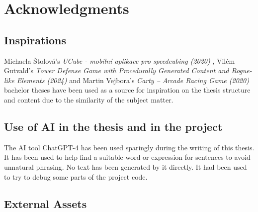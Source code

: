 \chapter{Acknowledgments}

\section{Inspirations}
Michaela Štolová's \textit{UCube - mobilní aplikace pro speedcubing (2020)} \cite{Stolova2020}, Vilém Gutvald's \textit{Tower Defense Game with Procedurally Generated Content and Rogue-like Elements (2024)} \cite{Gutvald2024} and Martin Vejbora's \textit{Carty – Arcade Racing Game (2020)} \cite{Vejbora2020} bachelor theses have been used as a source for inspiration on the thesis structure and content due to the similarity of the subject matter.

\section{Use of AI in the thesis and in the project}
The AI tool ChatGPT-4 has been used sparingly during the writing of this thesis. It has been used to help find a suitable word or expression for sentences to avoid unnatural phrasing. No text has been generated by it directly. It had been used to try to debug some parts of the project code.

\section{External Assets}